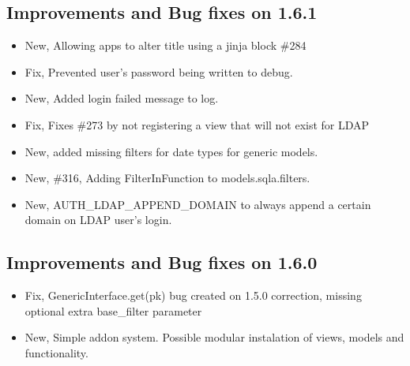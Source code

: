 \documentclass[letterpaper,10pt,english]{sphinxmanual}
\begin{document}
\subsection{Improvements and Bug fixes on 1.6.1}
\label{versions:improvements-and-bug-fixes-on-1-6-1}\begin{itemize}
\item {} 
New, Allowing apps to alter title using a jinja block \#284

\item {} 
Fix, Prevented user's password being written to debug.

\item {} 
New, Added login failed message to log.

\item {} 
Fix, Fixes \#273 by not registering a view that will not exist for LDAP

\item {} 
New, added missing filters for date types for generic models.

\item {} 
New, \#316, Adding FilterInFunction to models.sqla.filters.

\item {} 
New, AUTH\_LDAP\_APPEND\_DOMAIN to always append a certain domain on LDAP user's login.

\end{itemize}


\subsection{Improvements and Bug fixes on 1.6.0}
\label{versions:improvements-and-bug-fixes-on-1-6-0}\begin{itemize}
\item {} 
Fix, GenericInterface.get(pk) bug created on 1.5.0 correction, missing optional extra base\_filter parameter

\item {} 
New, Simple addon system. Possible modular instalation of views, models and functionality.

\end{itemize}
\end{document}
